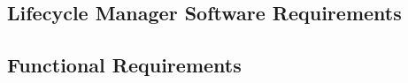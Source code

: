 \documentclass[letterpaper,10pt]{article}
\begin{document}
        \begin{appendices}
        \section{Lifecycle Manager Software Requirements}
        \label{app:reqs}
        

        \renewcommand\req[3]{\texttt{<#1 #2 #3>}}

        \renewcommand\nreq[5]{\texttt{<#1 #2 #3>}\\#4}



        \subsection{Functional Requirements}

       

\end{appendices}
\end{document}
